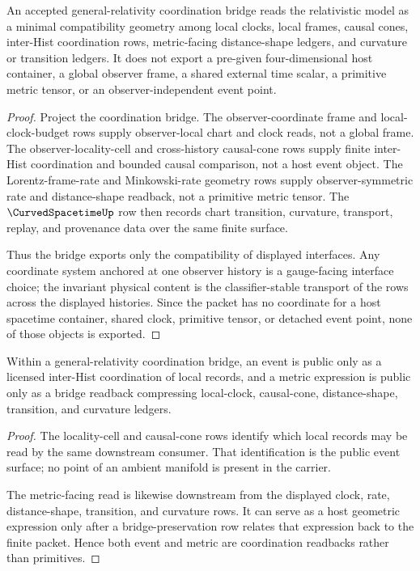 \begin{theorem}
\label{thm:philosophy-general-relativity-interface-coordination}
An accepted general-relativity coordination bridge reads the relativistic
model as a minimal compatibility geometry among local clocks, local frames,
causal cones, inter-Hist coordination rows, metric-facing distance-shape
ledgers, and curvature or transition ledgers. It does not export a pre-given
four-dimensional host container, a global observer frame, a shared external
time scalar, a primitive metric tensor, or an observer-independent event point.
\end{theorem}
\begin{proof}
Project the coordination bridge. The observer-coordinate frame and
local-clock-budget rows supply observer-local chart and clock reads, not a
global frame. The observer-locality-cell and cross-history causal-cone rows
supply finite inter-Hist coordination and bounded causal comparison, not a
host event object. The Lorentz-frame-rate and Minkowski-rate geometry rows
supply observer-symmetric rate and distance-shape readback, not a primitive
metric tensor. The $\CurvedSpacetimeUp$ row then records chart transition,
curvature, transport, replay, and provenance data over the same finite
surface.

Thus the bridge exports only the compatibility of displayed interfaces. Any
coordinate system anchored at one observer history is a gauge-facing interface
choice; the invariant physical content is the classifier-stable transport of
the rows across the displayed histories. Since the packet has no coordinate
for a host spacetime container, shared clock, primitive tensor, or detached
event point, none of those objects is exported.
\end{proof}

\begin{corollary}
\label{cor:philosophy-events-metrics-coordination-readbacks}
Within a general-relativity coordination bridge, an event is public only as a
licensed inter-Hist coordination of local records, and a metric expression is
public only as a bridge readback compressing local-clock, causal-cone,
distance-shape, transition, and curvature ledgers.
\end{corollary}
\begin{proof}
The locality-cell and causal-cone rows identify which local records may be
read by the same downstream consumer. That identification is the public event
surface; no point of an ambient manifold is present in the carrier.

The metric-facing read is likewise downstream from the displayed clock, rate,
distance-shape, transition, and curvature rows. It can serve as a host
geometric expression only after a bridge-preservation row relates that
expression back to the finite packet. Hence both event and metric are
coordination readbacks rather than primitives.
\end{proof}

